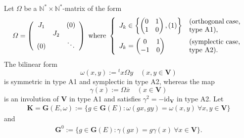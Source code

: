 \documentclass{amsart}
\theoremstyle{definition}
\newcommand{\NN}{\mathbb{N}^*}
\begin{document}
Let $\Omega$ be a $\NN\times\NN$-matrix of the form
\begin{equation}
\label{omega}
\Omega=\left(
\begin{array}{cccc}
J_1 & & (0) \\
 & J_2 \\
(0) & & \ddots
\end{array}
\right)\ 
\mbox{where}\ 
\left\{
\begin{array}{ll}
J_k\in\left\{\left(\begin{matrix} 0 & 1 \\ 1 & 0 \end{matrix}\right),\left(1\right)\right\}
& \parbox{2.6cm}{(orthogonal case, \\ type A1),} \\[4mm]
J_k=\left(\begin{matrix} 0 & 1 \\ -1 & 0 \end{matrix}\right) & \parbox{2.6cm}{(symplectic case, \\ type A2).}
\end{array}
\right.
\end{equation}
The bilinear form
\[\omega(x,y):={}^tx\Omega y\quad (x,y\in \mathbf{V})\]
is symmetric in type A1 and symplectic in type A2, whereas the map
\[\gamma(x):=\Omega\overline{x}\quad (x\in \mathbf{V})\]
is an involution of $\mathbf{V}$ in type A1 and satisfies $\gamma^2=-\mathrm{id}_{\mathbf{V}}$ in type A2.
Let
\begin{align*}
 \mathbf{K}=\mathbf{G}(E,\omega):=\{g\in \mathbf{G}(E):\omega(gx,gy)=\omega(x,y)\ \forall x,y\in\mathbf{V}\} 
 \end{align*}
 and
 \begin{align*}
  \mathbf{G}^0:=\{g\in \mathbf{G}(E):\gamma(gx)=g\gamma(x)\ \forall x\in\mathbf{V}\}.
\end{align*}
\end{document}
